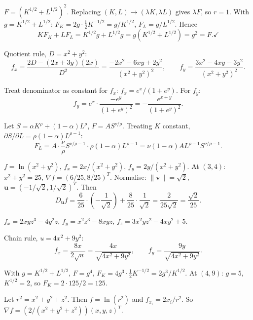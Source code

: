 \begin{solutions}
  \item $F=(K^{1/2}+L^{1/2})^2$. Replacing $(K,L)\to(\lambda K,\lambda L)$
        gives $\lambda F$, so $r=1$. With $g=K^{1/2}+L^{1/2}$:
        $F_K=2g\cdot\frac12K^{-1/2}=g/K^{1/2}$, $F_L=g/L^{1/2}$. Hence
        \[
          KF_K+LF_L=K^{1/2}g+L^{1/2}g=g(K^{1/2}+L^{1/2})=g^2=F. \checkmark
        \]

  \item Quotient rule, $D=x^2+y^2$:
        \[
          f_x=\frac{2D-(2x+3y)(2x)}{D^2}=\frac{-2x^2-6xy+2y^2}{(x^2+y^2)^2},
          \qquad f_y=\frac{3x^2-4xy-3y^2}{(x^2+y^2)^2} .
        \]

  \item Treat denominator as constant for $f_x$: $f_x=e^x/(1+e^y)$. For
        $f_y$:
        \[
          f_y=e^x\cdot\frac{-e^y}{(1+e^y)^2}=-\frac{e^{x+y}}{(1+e^y)^2} .
        \]

  \item Let $S=\alpha K^\rho+(1-\alpha)L^\rho$, $F=AS^{\nu/\rho}$.
        Treating $K$ constant, $\partial S/\partial L=\rho(1-\alpha)L^{\rho-1}$:
        \[
          F_L=A\cdot\frac{\nu}{\rho}S^{\nu/\rho-1}\cdot\rho(1-\alpha)L^{\rho-1}
            =\nu(1-\alpha)AL^{\rho-1}S^{\nu/\rho-1} .
        \]

  \item $f=\ln(x^2+y^2)$, $f_x=2x/(x^2+y^2)$, $f_y=2y/(x^2+y^2)$. At
        $(3,4)$: $x^2+y^2=25$, $\nabla f=(6/25,8/25)^T$. Normalise:
        $\|\mathbf{v}\|=\sqrt2$, $\mathbf{u}=(-1/\sqrt2,1/\sqrt2)^T$. Then
        \[
          D_{\mathbf{u}}f=\frac{6}{25}\cdot\left(-\frac{1}{\sqrt2}\right)
            +\frac{8}{25}\cdot\frac{1}{\sqrt2}=\frac{2}{25\sqrt2}
            =\frac{\sqrt2}{25} .
        \]

  \item $f_x=2xyz^3-4y^2z$, $f_y=x^2z^3-8xyz$,
        $f_z=3x^2yz^2-4xy^2+5$.

  \item Chain rule, $u=4x^2+9y^2$:
        \[
          f_x=\frac{8x}{2\sqrt u}=\frac{4x}{\sqrt{4x^2+9y^2}}, \qquad
          f_y=\frac{9y}{\sqrt{4x^2+9y^2}} .
        \]

  \item With $g=K^{1/2}+L^{1/2}$, $F=g^4$,
        $F_K=4g^3\cdot\frac12K^{-1/2}=2g^3/K^{1/2}$. At $(4,9)$: $g=5$,
        $K^{1/2}=2$, so $F_K=2\cdot125/2=125$.

  \item Let $r^2=x^2+y^2+z^2$. Then $f=\ln(r^2)$ and $f_{x_i}=2x_i/r^2$.
        So $\nabla f=(2/(x^2+y^2+z^2))(x,y,z)^T$.


\end{solutions}
